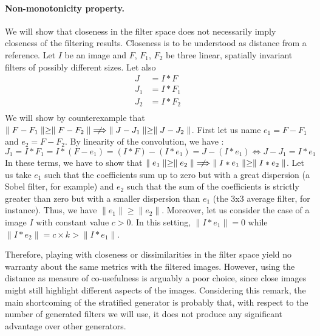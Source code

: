 \documentclass[a4paper]{report}
\begin{document}
			\paragraph{Non-monotonicity property.}
			We will show that closeness in the filter space does not necessarily imply closeness of the filtering results. Closeness is to be understood as distance from a reference.
			Let $I$ be an image and $F$, $F_1$, $F_2$ be three linear, spatially invariant filters of possibly different sizes. Let also
			\begin{align*}
				J &= I * F \\
				J_1 &= I * F_1 \\
				J_2 &= I * F_2 \\
			\end{align*}
			We will show by counterexample that $\parallel F - F_1 \parallel \geq \parallel F - F_2 \parallel \centernot\implies \parallel J - J_1 \parallel \geq \parallel J - J_2 \parallel$.
			First let us name $e_1 = F - F_1$ and $e_2 = F - F_2$. By linearity of the convolution, we have :
			\[
				J_1 = I * F_1 =  I * (F - e_1) = (I * F) - (I * e_1) = J - (I * e_1)
				\iff
				J - J_1 = I * e_1
			\]
			In these terms, we have to show that $\parallel e_1 \parallel \geq \parallel e_2 \parallel \centernot\implies \parallel I * e_1 \parallel \geq \parallel I * e_2 \parallel$. 
			Let us take $e_1$ such that the coefficients sum up to zero but with a great dispersion (a Sobel filter, for example) and $e_2$ such that the sum of the coefficients is strictly greater than zero but with a smaller dispersion than $e_1$ (the 3x3 average filter, for instance). Thus, we have  $\parallel e_1 \parallel \geq \parallel e_2 \parallel$. Moreover, let us consider the case of a image $I$ with constant value $c > 0$. In this setting, $\parallel I * e_1 \parallel = 0$ while $\parallel I * e_2 \parallel = c \times k > \parallel I * e_1 \parallel$.
			\par
			Therefore, playing with closeness or dissimilarities in the filter space yield no warranty about the same metrics with the filtered images. However, using the distance as measure of co-usefulness is arguably a poor choice, since close images might still highlight different aspects of the images. Considering this remark, the main shortcoming of the stratified generator is probably that, with respect to the number of generated filters we will use, it  does not produce any significant advantage over other generators.
			
			

			
\end{document}
